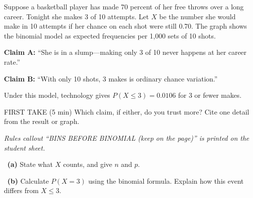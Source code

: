\documentclass[11pt]{article}
\begin{document}
Suppose a basketball player has made 70 percent of her free throws over a long career. Tonight she makes 3 of 10 attempts. Let $X$ be the number she would make in 10 attempts if her chance on each shot were still 0.70. The graph shows the binomial model as expected frequencies per 1,000 sets of 10 shots.\par\smallskip \textbf{Claim A:} ``She is in a slump---making only 3 of 10 never happens at her career rate.''\par \textbf{Claim B:} ``With only 10 shots, 3 makes is ordinary chance variation.''\par Under this model, technology gives $P(X\leq3)=0.0106$ for 3 or fewer makes.\par
\begin{center}
\end{center}
\begin{firsttakebox}{FIRST TAKE (5 min)}
Which claim, if either, do you trust more? Cite one detail from the result or graph.\par
{}
\end{firsttakebox}

\textit{Rules callout ``BINS BEFORE BINOMIAL (keep on the page)'' is printed on the student sheet.}\par\medskip

~\textbf{(a)} State what $X$ counts, and give $n$ and $p$.\par
{}

~\textbf{(b)} Calculate $P(X=3)$ using the binomial formula. Explain how this event differs from $X\leq3$.\par
{}
\end{document}
